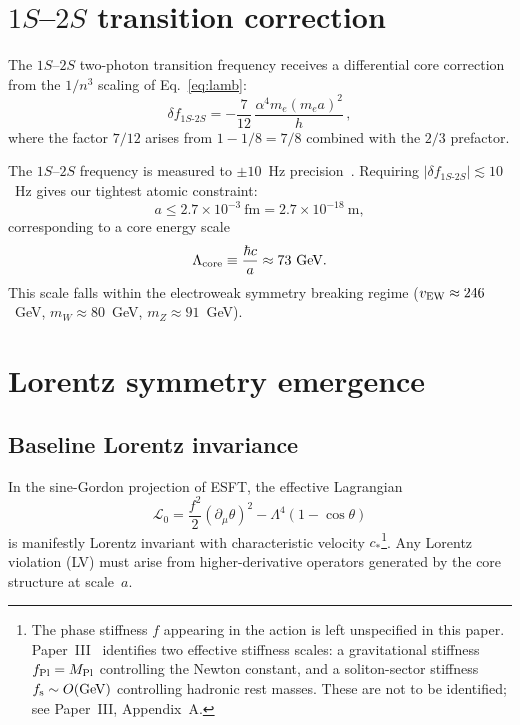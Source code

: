 ﻿\documentclass[a4paper,12pt]{article}
\begin{document}
\section{$1S$--$2S$ transition correction}
\label{sec:1s2s}

The $1S$--$2S$ two-photon transition frequency receives a differential
core correction from the $1/n^3$ scaling of Eq.~\eqref{eq:lamb}:
\begin{equation}
  \delta f_{1S\text{-}2S}
    = -\frac{7}{12}\,\frac{\alpha^4 m_e(m_e a)^2}{h}\,,
  \label{eq:1s2s}
\end{equation}
where the factor $7/12$ arises from $1-1/8=7/8$ combined with the
$2/3$ prefactor.

The $1S$--$2S$ frequency is measured to $\pm 10$~Hz
precision~\cite{Parthey2011}.  Requiring
$|\delta f_{1S\text{-}2S}|\lesssim 10$~Hz gives our tightest atomic
constraint:
\begin{equation}
  \boxed{a \leq 2.7\times 10^{-3}~\text{fm}
    = 2.7\times 10^{-18}~\text{m}},
  \label{eq:1s2sbound}
\end{equation}
corresponding to a core energy scale
\begin{equation}
  \Lambda_{\rm core} \equiv \frac{\hbar c}{a}
    \approx 73~\text{GeV}.
  \label{eq:ewscale}
\end{equation}
This scale falls within the electroweak symmetry breaking regime
($v_{\rm EW}\approx 246$~GeV, $m_W\approx 80$~GeV,
$m_Z\approx 91$~GeV).

\section{Lorentz symmetry emergence}
\label{sec:lorentz}

\subsection{Baseline Lorentz invariance}

In the sine-Gordon projection of ESFT, the effective Lagrangian
\begin{equation}
  \mathcal{L}_0 = \frac{f^2}{2}(\partial_\mu\theta)^2
    - \Lambda^4(1-\cos\theta)
\end{equation}
is manifestly Lorentz invariant with characteristic velocity $c_*$\footnote{The phase stiffness $f$ appearing in the action is left unspecified in this paper.  Paper~III~\cite{PaperIII} identifies two effective stiffness scales: a gravitational stiffness $f_{\rm Pl} = M_{\rm Pl}$ controlling the Newton constant, and a soliton-sector stiffness $f_{\rm s}\sim O(\text{GeV})$ controlling hadronic rest masses.  These are not to be identified; see Paper~III, Appendix~A.}.
Any Lorentz violation (LV) must arise from higher-derivative operators
generated by the core structure at scale~$a$.
\end{document}
